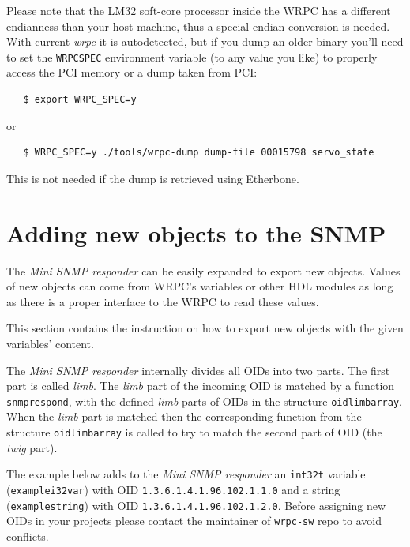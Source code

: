 \documentclass[a4paper, 12pt]{article}
\renewcommand{\_}{\underscore\allowbreak}
\begin{document}
Please note that the LM32 soft-core processor inside the WRPC has a different
endianness than your host machine, thus a special endian conversion is needed.
With current \textit{wrpc} it is autodetected, but if you dump an older binary
you'll need to set the
\texttt{WRPC\_SPEC} environment variable (to any value you like) to properly
access the PCI memory or a dump taken from PCI:
\begin{lstlisting}
   $ export WRPC_SPEC=y
\end{lstlisting}
or
\begin{lstlisting}
   $ WRPC_SPEC=y ./tools/wrpc-dump dump-file 00015798 servo_state
\end{lstlisting}
This is not needed if the dump is retrieved using Etherbone.

\newpage
\section{Adding new objects to the SNMP}
\label{Adding new objects to the SNMP}

The \textit{Mini SNMP responder} can be easily expanded to export new objects.
Values of new objects can come from WRPC's variables or other HDL modules
as long as there is a proper interface to the WRPC to read these values.

This section contains the instruction on how to export new objects with
the given variables' content.

The \textit{Mini SNMP responder} internally divides all OIDs into two parts.
The first part is called \textit{limb}. The \textit{limb} part of the incoming OID is
matched by a function \texttt{snmp\_respond}, with the defined \textit{limb} parts of OIDs
in the structure \texttt{oid\_limb\_array}.
When the \textit{limb} part is matched then the corresponding function from
the structure \texttt{oid\_limb\_array} is called to try to match the second part of
OID (the \textit{twig} part).

\begin{sloppypar} %
The example below adds to the \textit{Mini SNMP responder} an \texttt{int32\_t} variable
(\texttt{example\_i32var}) with OID \texttt{1.3.6.1.4.1.96.102.1.1.0} and a string
(\texttt{example\_string}) with OID \texttt{1.3.6.1.4.1.96.102.1.2.0}.
Before assigning new OIDs in your projects please contact the maintainer of
\texttt{wrpc-sw} repo to avoid conflicts.
\end{sloppypar}
\end{document}
